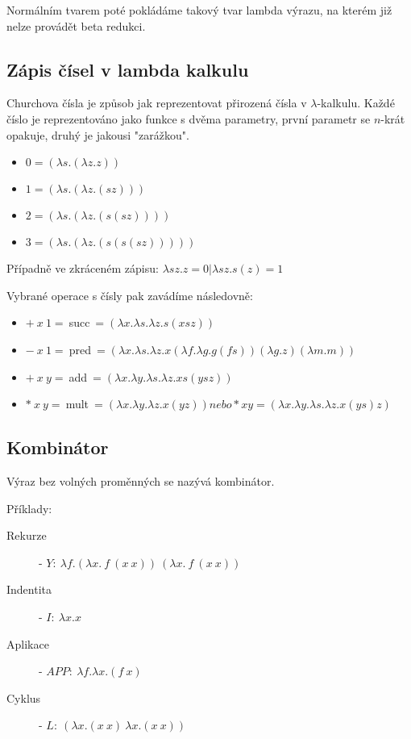 \documentclass{szzclass}
\begin{document}
Normálním tvarem poté pokládáme takový tvar lambda výrazu, na kterém již nelze provádět beta redukci.

\subsection{Zápis čísel v lambda kalkulu}

Churchova čísla je způsob jak reprezentovat přirozená čísla v $\lambda$-kalkulu. Každé číslo je reprezentováno jako funkce s dvěma parametry, první parametr se  $n$-krát opakuje, druhý je jakousi "zarážkou".

\begin{itemize}
    \item $0 = (\lambda s.(\lambda z.z))$
    \item $1 = (\lambda s.(\lambda z. (s z)))$
    \item $2 = (\lambda s.(\lambda z. (s (s z))))$
    \item $3 = (\lambda s.(\lambda z. (s (s (s z)))))$
\end{itemize}

Případně ve zkráceném zápisu: $\lambda sz.z = 0 | \lambda sz. s(z) = 1$

Vybrané operace s čísly pak zavádíme následovně:
\begin{itemize}
    \item $+~x~1 =~$succ$~= (\lambda x. \lambda s. \lambda z. s (x s z))$
    \item $-~x~1 =~$pred$~= (\lambda x. \lambda s. \lambda z. x (\lambda f. \lambda g.g (f s)) (\lambda g.z) (\lambda m.m))$
    \item $+~x~y =~$add$~= (\lambda x. \lambda y. \lambda s. \lambda z. x s (y s z))$
    \item $*~x~y =~$mult$~= (\lambda x. \lambda y. \lambda z. x (y z)) nebo * x y = (\lambda x. \lambda y. \lambda s. \lambda z. x (y s) z)$
\end{itemize}

\clearpage
\subsection{Kombinátor}
Výraz bez volných proměnných se nazývá kombinátor.

Příklady:
\begin{description}
\item[Rekurze] - $Y:~\lambda f.(\lambda x.~f~(x~x))~(\lambda x.~f~(x~x))$
\item[Indentita] - $I:~\lambda x.x$
\item[Aplikace] - $APP:~\lambda f.\lambda x.(f~x)$
\item[Cyklus] - $L:~(\lambda x.(x~x)~\lambda x.(x~x))$
\end{description}
\end{document}
